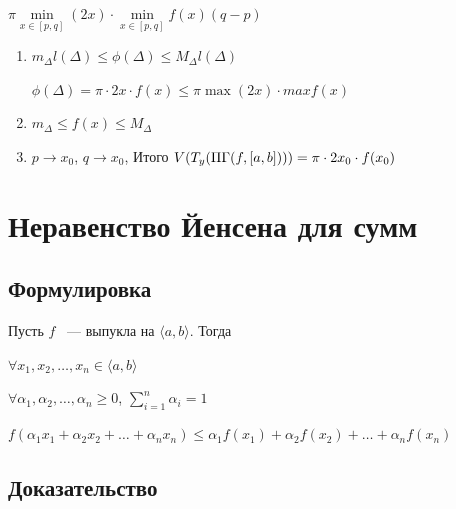 \documentclass{article}
\begin{document}
\begin{enumerate}
                $\pi \min\limits_{x \in [p, q]} (2x) \cdot \min\limits_{x \in [p, q]} f(x) (q - p)$
            
                \begin{enumerate}
            
                    \item $m_{\Delta} l(\Delta) \leq \phi(\Delta) \leq M_{\Delta} l(\Delta)$
                
                        $\phi(\Delta) = \pi \cdot 2 x \cdot f(x) \leq \pi \max (2x) \cdot max f(x)$
                    
                    \item $m_{\Delta} \leq f(x) \leq M_{\Delta}$
                
                    \item $p \rightarrow x_0$, $q \rightarrow x_0$, Итого $V(T_y(\Pi\Gamma(f, [a, b]))) = \pi \cdot 2 x_0 \cdot f(x_0)$
                
                \end{enumerate}
            
            \end{enumerate}
        
    \newpage
    
    \section{Неравенство Йенсена для сумм}
    
        \subsection{Формулировка}
        
            Пусть $f$ ~--- выпукла на $\langle a, b \rangle$. Тогда
            
            $\forall x_1, x_2, \ldots, x_n \in \langle a, b \rangle$
            
            $\forall \alpha_1, \alpha_2, \ldots, \alpha_n \geq 0$, $\sum\limits_{i = 1}^n \alpha_i = 1$
            
            $f(\alpha_1 x_1 + \alpha_2 x_2 + \ldots + \alpha_n x_n) \leq \alpha_1 f(x_1) + \alpha_2 f(x_2) + \ldots + \alpha_n f(x_n)$
            
        \subsection{Доказательство}
        
\end{document}
